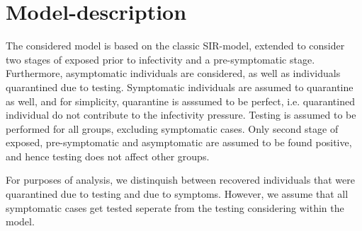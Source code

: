 \documentclass[10pt,a4paper]{article}
\begin{document}



\section{Model-description}

The considered model is based on the classic SIR-model, 
extended to consider two stages of exposed prior to infectivity and a pre-symptomatic stage. 
Furthermore, asymptomatic individuals are considered, as well as individuals quarantined due to testing.
Symptomatic individuals are assumed to quarantine as well, and for simplicity, quarantine is asssumed to be perfect, i.e. quarantined individual do not contribute to the infectivity pressure.
Testing is assumed to be performed for all groups, excluding symptomatic cases. Only second stage of exposed, pre-symptomatic and asymptomatic are assumed to be found positive, and hence testing does not affect other groups. 
 
For purposes of analysis, we distinquish between recovered individuals that were quarantined due to testing and due to symptoms. However, we assume that all symptomatic cases get tested seperate from the testing considering within the model.
\end{document}
